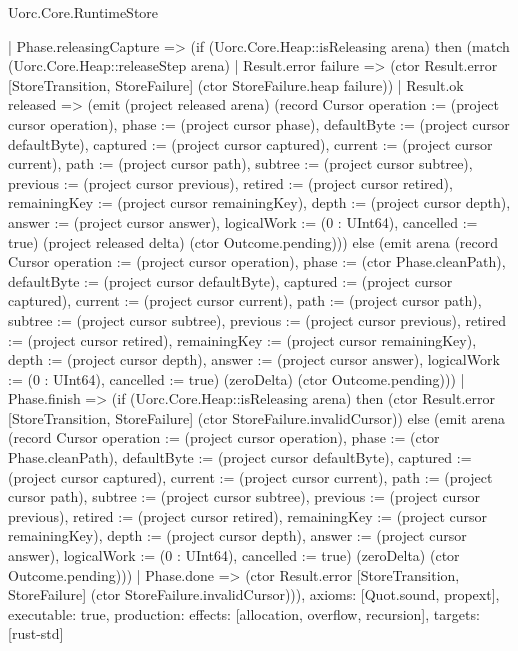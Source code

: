 \begin{lexlean}{Uorc.Core.RuntimeStore}
\begin{semanticmodule}
{    | Phase.releasingCapture => (if (Uorc.Core.Heap::isReleasing arena) then (match (Uorc.Core.Heap::releaseStep arena)
      | Result.error failure => (ctor Result.error [StoreTransition, StoreFailure] (ctor StoreFailure.heap failure))
      | Result.ok released => (emit (project released arena) (record Cursor {operation := (project cursor operation), phase := (project cursor phase), defaultByte := (project cursor defaultByte), captured := (project cursor captured), current := (project cursor current), path := (project cursor path), subtree := (project cursor subtree), previous := (project cursor previous), retired := (project cursor retired), remainingKey := (project cursor remainingKey), depth := (project cursor depth), answer := (project cursor answer), logicalWork := (0 : UInt64), cancelled := true}) (project released delta) (ctor Outcome.pending))) else (emit arena (record Cursor {operation := (project cursor operation), phase := (ctor Phase.cleanPath), defaultByte := (project cursor defaultByte), captured := (project cursor captured), current := (project cursor current), path := (project cursor path), subtree := (project cursor subtree), previous := (project cursor previous), retired := (project cursor retired), remainingKey := (project cursor remainingKey), depth := (project cursor depth), answer := (project cursor answer), logicalWork := (0 : UInt64), cancelled := true}) (zeroDelta) (ctor Outcome.pending)))
    | Phase.finish => (if (Uorc.Core.Heap::isReleasing arena) then (ctor Result.error [StoreTransition, StoreFailure] (ctor StoreFailure.invalidCursor)) else (emit arena (record Cursor {operation := (project cursor operation), phase := (ctor Phase.cleanPath), defaultByte := (project cursor defaultByte), captured := (project cursor captured), current := (project cursor current), path := (project cursor path), subtree := (project cursor subtree), previous := (project cursor previous), retired := (project cursor retired), remainingKey := (project cursor remainingKey), depth := (project cursor depth), answer := (project cursor answer), logicalWork := (0 : UInt64), cancelled := true}) (zeroDelta) (ctor Outcome.pending)))
    | Phase.done => (ctor Result.error [StoreTransition, StoreFailure] (ctor StoreFailure.invalidCursor))),
  axioms: [Quot.sound, propext],
  executable: true,
  production: {effects: [allocation, overflow, recursion], targets: [rust-std]}
}


\end{semanticmodule}
\end{lexlean}
